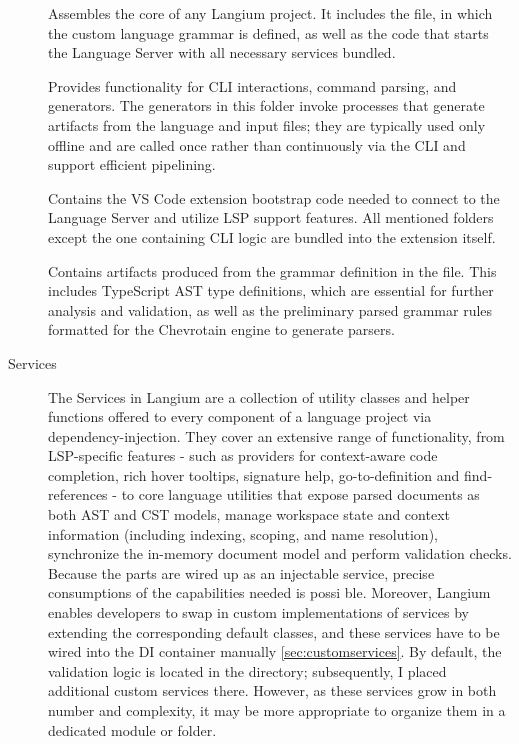 \begin{description}
  \item[] Assembles the core of any Langium project. It includes the  file, in which the custom language grammar is defined, as well as
    the code that starts the Language Server with all necessary services bundled.
  \item[] Provides functionality for CLI interactions, command parsing, and generators. The generators in this folder invoke processes that generate artifacts
    from the language and input files; they are typically used only offline and are called once rather than continuously via the CLI and support efficient pipelining.
  \item[] Contains the VS Code extension bootstrap code needed to connect to the Language Server and utilize LSP support features.
    All mentioned folders except the one containing CLI logic are bundled into the extension itself.
  \item[] Contains artifacts produced from the grammar definition in the  file. This includes TypeScript AST type definitions,
    which are essential for further analysis and validation, as well as the preliminary parsed grammar rules formatted for the Chevrotain engine to generate parsers.
  \item[\textsf{Services}] The Services in Langium are a collection of utility classes and helper functions offered to every component of a language project via
    dependency-injection. They cover an extensive range of functionality, from LSP-specific features - such as providers for context-aware code completion, rich hover
    tooltips, signature help, go-to-definition and find-references - to core language utilities that expose parsed documents as both AST and CST models, manage workspace
    state and context information (including indexing, scoping, and name resolution), synchronize the in-memory document model and perform validation checks.
    Because the parts are wired up as an injectable service, precise consumptions of the capabilities needed is possi ble. Moreover, Langium enables developers to swap in
    custom implementations of services by extending the corresponding default classes, and these services have to be wired into the DI container manually \ref{sec:customservices}.
    By default, the validation logic is located in the  directory; subsequently, I placed additional custom services there.
    However, as these services grow in both number and complexity, it may be more appropriate to organize them in a dedicated module or folder.
\end{description}

